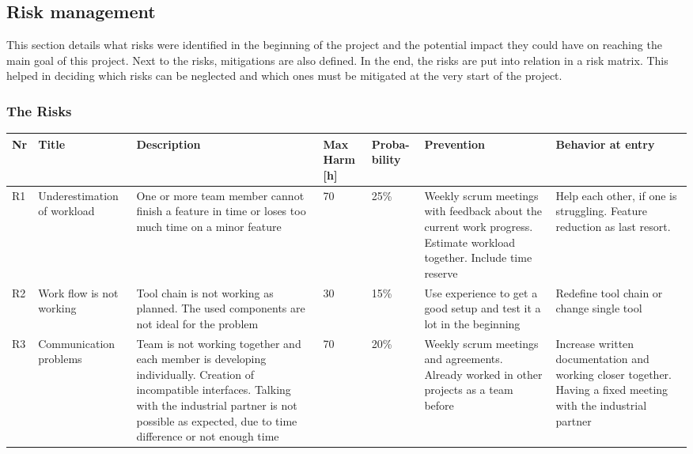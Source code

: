 \subsection{Risk management}
This section details what risks were identified in the beginning of the project and the potential impact they could have on reaching the main goal of this project. Next to the risks, mitigations are also defined. In the end, the risks are put into relation in a risk matrix. This helped in deciding which risks can be neglected and which ones must be mitigated at the very start of the project. 
\subsubsection{The Risks}
\begin{landscape}
	\begin{longtable}[H]
		{l|p{}| p{} | p{} | p{} | p{} | p{}}
		\rowcolor{gray!50}
		\textbf{Nr} & \textbf{Title} & \textbf{Description} & 
		\textbf{Max Harm [h]} & \textbf{Proba- bility} & \textbf{Prevention} &  
		\textbf{Behavior at entry}\\ \hline
		
		R1 & Underestimation of workload & One or more team member cannot finish a feature in time or loses too much time on a minor feature & 70 & 25\% & Weekly scrum meetings with feedback about the current work progress. Estimate workload together. Include time reserve & Help each other, if one is struggling. Feature reduction as last resort. \\ 
		
		R2 & Work flow is not working & Tool chain is not working as planned. The used components are not ideal for the problem & 30 & 15\% & Use experience to get a good setup and test it a lot in the beginning & Redefine tool chain or change single tool \\ 
		
		R3 & Communication problems & Team is not working together and each member is developing individually. Creation of incompatible interfaces. Talking with the industrial partner is not possible as expected, due to time difference or not enough time & 70 & 20\% & Weekly scrum meetings and agreements. Already worked in other projects as a team before & Increase written documentation and working closer together. Having a fixed meeting with the industrial partner \\ 
		

\end{longtable}
\end{landscape}
